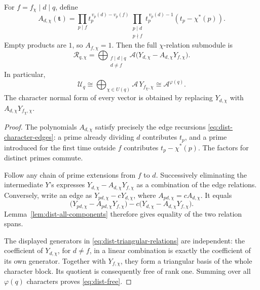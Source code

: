 \begin{theorem}
\label{thm:dist-normal-form}
For \(f=f_\chi\mid d\mid q\), define
\begin{equation}
 A_{d,\chi}(\mathbf t)=
 \prod_{p\mid f}t_p^{\,v_p(d)-v_p(f)}
 \prod_{\substack{p\mid d\\p\nmid f}}
       t_p^{\,v_p(d)-1}(t_p-\chi^*(p)).
 \label{eq:dist-normal-coefficient}
\end{equation}
Empty products are \(1\), so \(A_{f,\chi}=1\).
Then the full \(\chi\)-relation submodule is
\begin{equation}
 \mathcal R_{q,\chi}
 =\bigoplus_{\substack{f\mid d\mid q\\d\ne f}}
   \mathcal A\bigl(Y_{d,\chi}-A_{d,\chi}Y_{f,\chi}\bigr).
 \label{eq:dist-triangular-relations}
\end{equation}
In particular,
\begin{equation}
 \mathcal U_q\cong
 \bigoplus_{\chi\in\widehat{U(q)}}\mathcal A\,Y_{f_\chi,\chi}
 \cong\mathcal A^{\varphi(q)}.
 \label{eq:dist-free}
\end{equation}
The character normal form of every vector is obtained by replacing
\(Y_{d,\chi}\) with \(A_{d,\chi}Y_{f_\chi,\chi}\).
\end{theorem}

\begin{proof}
The polynomials \(A_{d,\chi}\) satisfy precisely the edge recursions
\eqref{eq:dist-character-edges}: a prime already dividing \(d\)
contributes \(t_p\), and a prime introduced for the first time
outside \(f\) contributes \(t_p-\chi^*(p)\).
The factors for distinct primes commute.

Follow any chain of prime extensions from \(f\) to \(d\).
Successively eliminating the intermediate \(Y\)'s expresses
\(Y_{d,\chi}-A_{d,\chi}Y_{f,\chi}\) as a combination of the
edge relations. Conversely, write an edge as
\(Y_{pd,\chi}-cY_{d,\chi}\), where
\(A_{pd,\chi}=cA_{d,\chi}\). It equals
\[
 \bigl(Y_{pd,\chi}-A_{pd,\chi}Y_{f,\chi}\bigr)
 -c\bigl(Y_{d,\chi}-A_{d,\chi}Y_{f,\chi}\bigr).
 \]
Lemma~\ref{lem:dist-all-components} therefore gives equality of the
two relation spans.

The displayed generators in \eqref{eq:dist-triangular-relations}
are independent: the coefficient of \(Y_{d,\chi}\), for \(d\ne f\),
in a linear combination is exactly the coefficient of its own
generator. Together with \(Y_{f,\chi}\), they form a triangular
basis of the whole character block. Its quotient is consequently
free of rank one. Summing over all \(\varphi(q)\) characters proves
\eqref{eq:dist-free}.
\end{proof}

